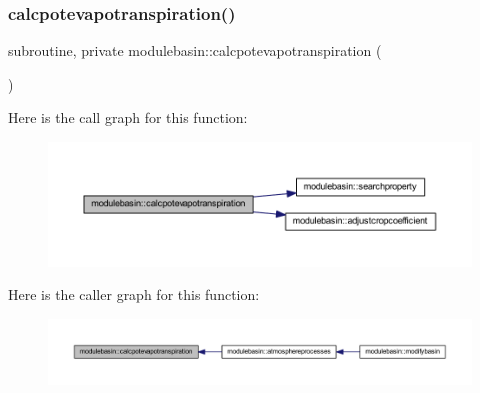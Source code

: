 \mbox{\label{namespacemodulebasin_a112f8b0445f6c2ff174a1292c9efd8c2}} 
\subsubsection{\texorpdfstring{calcpotevapotranspiration()}{calcpotevapotranspiration()}}
{\footnotesize\ttfamily subroutine, private modulebasin\+::calcpotevapotranspiration (\begin{DoxyParamCaption}{ }\end{DoxyParamCaption})\hspace{0.3cm}{\ttfamily [private]}}

Here is the call graph for this function\+:\nopagebreak
\begin{figure}[H]
\begin{center}
\leavevmode
\includegraphics[width=350pt]{namespacemodulebasin_a112f8b0445f6c2ff174a1292c9efd8c2_cgraph}
\end{center}
\end{figure}
Here is the caller graph for this function\+:\nopagebreak
\begin{figure}[H]
\begin{center}
\leavevmode
\includegraphics[width=350pt]{namespacemodulebasin_a112f8b0445f6c2ff174a1292c9efd8c2_icgraph}
\end{center}
\end{figure}
\mbox{\label{namespacemodulebasin_ac23d68c52a8a6bf444bd3ade576da5bb}} 
